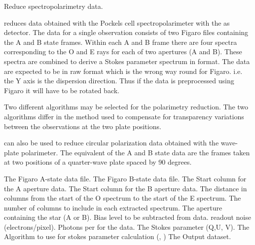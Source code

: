 \begin{manroutinedescription}
        Reduce {} spectropolarimetry data.

        {} reduces data obtained with the {} %
Pockels cell
        spectropolarimeter with the {} as detector. The data for a
        single observation consists of two Figaro files containing the
        A and B state frames. Within each A and B frame there are four
        spectra corresponding to the O and E rays for each of two
        apertures (A and B). These spectra are combined
        to derive a Stokes parameter spectrum in {} format.
        The {} data are expected to be in raw {} format %
which is
        the wrong way round for Figaro. i.e. the Y axis is the dispersion
        direction. Thus if the data is preprocessed using Figaro it will
        have to be rotated back.

        Two different algorithms may be selected for the polarimetry
        reduction. The two algorithms differ in the method used to
        compensate for transparency variations between the observations
        at the two plate positions.

        {} can also be used to reduce circular polarization
        data obtained with the wave-plate polarimeter. The equivalent of
        the A and B state data are the frames taken at two positions of
        a quarter-wave plate spaced by 90 degrees.

\begin{manparametertable}
     The Figaro A-state data file.
     The Figaro B-state data file.
  The Start column for the A %
aperture data.
  The Start column for the B %
aperture data.
  The distance in columns from %
the start of the O
                               spectrum to the start of the E spectrum.
  The number of columns to %
include in each
                               extracted spectrum.
     The aperture containing the %
star (A or B).
     Bias level to be subtracted %
from data.
     {} readout %
noise (electrons/pixel).
     Photons per {} %
for the {} data.
     The Stokes parameter (Q,U,%
V).
     The Algorithm to use for %
stokes
                               parameter calculation ({}, {})
  The %
Output dataset.


\end{manparametertable}
\end{manroutinedescription}
